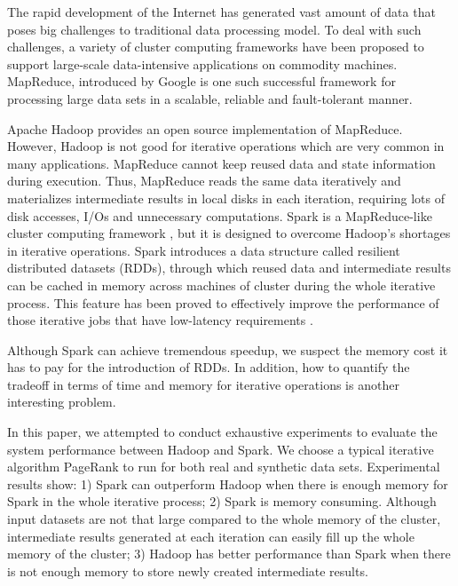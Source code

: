 \documentclass[12pt,conference,letterpaper]{IEEEtran}
\begin{document}
The rapid development of the Internet has generated vast amount of data that poses big challenges to traditional data processing model. To deal with such challenges, a variety of cluster computing frameworks have been proposed to support large-scale data-intensive applications on commodity machines. MapReduce, introduced by Google\cite{jdean2004} is one such successful framework for processing large data sets in a scalable, reliable and fault-tolerant manner. 

Apache Hadoop\cite{url_hadoop} provides an open source implementation of MapReduce.
However, Hadoop is not good for iterative operations which are very common in many applications. MapReduce cannot keep reused data and state information during execution. Thus, MapReduce reads the same data iteratively and materializes intermediate results in local disks in each iteration, requiring lots of disk accesses, I/Os and unnecessary computations. Spark is a MapReduce-like cluster computing framework \cite{url_spark, matei2010}, but it is designed to overcome Hadoop's shortages in iterative operations. Spark introduces a data structure called resilient distributed datasets (RDDs)\cite{matei2012}, through which reused data and intermediate results can be cached in memory across machines of cluster during the whole iterative process. This feature has been proved to effectively improve the performance of those iterative jobs that have low-latency requirements \cite{matei2012}.


Although Spark can achieve tremendous speedup, we suspect the memory cost it has to pay for the introduction of RDDs.  In addition, how to quantify the tradeoff in terms of time and memory for iterative operations is another interesting problem. %

In this paper, we attempted to conduct exhaustive experiments to evaluate the system performance between Hadoop and Spark. We choose a typical iterative algorithm PageRank \cite{page1999} to run for both real and synthetic data sets. Experimental results show: 1) Spark can outperform Hadoop when there is enough memory for Spark in the whole iterative process; 2) Spark is memory consuming. Although input datasets are not that large compared to the whole memory of the cluster, intermediate results generated at each iteration can easily fill up the whole memory of the cluster; 3) Hadoop has better performance than Spark when there is not enough memory to store newly created intermediate results.
\end{document}
